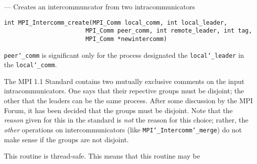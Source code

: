 \startmanpage
{}
--- Creates an intercommuncator from two intracommunicators 
\startvb\begin{verbatim}
int MPI_Intercomm_create(MPI_Comm local_comm, int local_leader, 
                       MPI_Comm peer_comm, int remote_leader, int tag, 
                       MPI_Comm *newintercomm)

\end{verbatim}
\endvb

\par
{}
\par
{}
{\tt peer{\tt \char`\_}comm} is significant only for the process designated the
{\tt local{\tt \char`\_}leader} in the {\tt local{\tt \char`\_}comm}.
\par
The MPI 1.1 Standard contains two mutually exclusive comments on the
input intracommunicators.  One says that their repective groups must be
disjoint; the other that the leaders can be the same process.  After
some discussion by the MPI Forum, it has been decided that the groups must
be disjoint.  Note that the {\em reason} given for this in the standard is
{\em not} the reason for this choice; rather, the {\em other} operations on
intercommunicators (like {\tt MPI{\tt \char`\_}Intercomm{\tt \char`\_}merge}) do not make sense if the
groups are not disjoint.
\par
{}
\par
This routine is thread-safe.  This means that this routine may be

